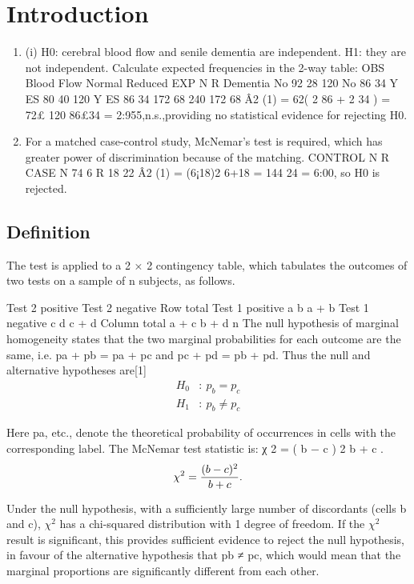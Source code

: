 \documentclass[a4paper,12pt]{article}
\begin{document}
\maketitle

\section{Introduction}
\begin{enumerate}
    \item (i) H0: cerebral blood flow and senile dementia are independent.
H1: they are not independent.
Calculate expected frequencies in the 2-way table:
OBS Blood Flow Normal Reduced EXP N R
Dementia No 92 28 120 No 86 34
Y ES 80 40 120 Y ES 86 34
172 68 240 172 68
Â2
(1) = 62( 2
86 + 2
34 ) = 72£ 120
86£34 = 2:955,n.s.,providing no statistical evidence for rejecting
H0.
\item  For a matched case-control study, McNemar’s test is required, which has greater power
of discrimination because of the matching.
CONTROL
N R
CASE N 74 6
R 18 22
Â2
(1) = (6¡18)2
6+18 = 144
24 = 6:00, so H0 is rejected.
\end{enumerate}
\subsection*{Definition}
The test is applied to a 2 × 2 contingency table, which tabulates the outcomes of two tests on a sample of n subjects, as follows. 

Test 2 positive
Test 2 negative
Row total 
Test 1 positive
a
b
a + b 
Test 1 negative
c
d
c + d 
Column total
a + c
b + d
n 
The null hypothesis of marginal homogeneity states that the two marginal probabilities for each outcome are the same, i.e. pa + pb = pa + pc and pc + pd = pb + pd. 
Thus the null and alternative hypotheses are[1] 
\[{\displaystyle {\begin{aligned}H_{0}&:~p_{b}=p_{c}\\H_{1}&:~p_{b}\neq p_{c}\end{aligned}}} \]

Here pa, etc., denote the theoretical probability of occurrences in cells with the corresponding label. 
The McNemar test statistic is: 
χ 2 = ( b − c ) 2 b + c . \[{\displaystyle \chi ^{2}={(b-c)^{2} \over b+c}.} \]

Under the null hypothesis, with a sufficiently large number of discordants (cells b and c), 
${\displaystyle \chi ^{2}} $
 has a chi-squared distribution with 1 degree of freedom. If the 
${\displaystyle \chi ^{2}} $
 result is significant, this provides sufficient evidence to reject the null hypothesis, in favour of the alternative hypothesis that pb ≠ pc, which would mean that the marginal proportions are significantly different from each other. 
\end{document}
